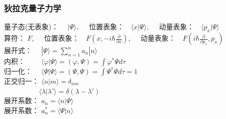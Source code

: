 \begin{frame} 
    \frametitle{狄拉克量子力学}  
    量子态(无表象)： $\hspace{1em}|\Psi \rangle, \quad$ 位置表象：$\hspace{1em} \langle x |\Psi \rangle , \quad$ 动量表象：$\hspace{1em} \langle p_x |\Psi \rangle$ \\ \vspace{0.1em}
    算符： $F, \quad$ 位置表象：$\hspace{1em} F(x, -i\hbar \frac{\partial }{\partial x}) , \quad$ 动量表象：$\hspace{1em} F(i\hbar \frac{\partial }{\partial p_x}, p_x) $ \\ \vspace{0.1em}
    展开式： $\hspace{1em}|\Psi \rangle =\sum\limits_{n=1} ^n a_n |n \rangle$ \\
    内积：   $\hspace{2em}\langle \varphi | \Psi \rangle = (\varphi, \Psi)= \int \varphi^*\Psi d\tau $ \\  \vspace{0.1em}
    归一化： $\hspace{1em}\langle \Psi | \Psi \rangle = (\Psi, \Psi)= \int \Psi^*\Psi d\tau = 1 $ \\ \vspace{0.1em}
    正交归一： $\langle n | m \rangle = \delta_{nm} $ \\ \vspace{0.1em}
    $ \hspace{5em} \langle \lambda | \lambda' \rangle = \delta(\lambda-\lambda') $\\ \vspace{0.2em}
    展开系数： $ a_n= \langle n | \Psi \rangle$ \\ \vspace{0.2em}
    展开系数： $ a_n ^*= \langle \Psi | n \rangle$ \\ \vspace{0.2em}
\end{frame} 
 
